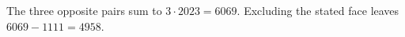The three opposite pairs sum to $3\cdot2023=6069$. Excluding the stated face leaves $6069-1111=\boxed{4958}$.

